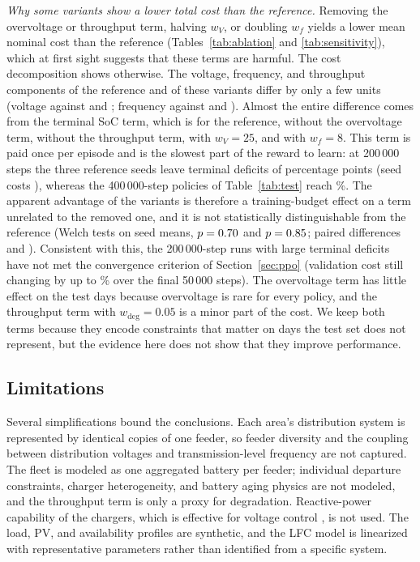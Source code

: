 \emph{Why some variants show a lower total cost than the reference.}
Removing the overvoltage or throughput term, halving $w_V$, or
doubling $w_f$ yields a lower mean nominal cost than the reference
(Tables~\ref{tab:ablation} and \ref{tab:sensitivity}),
which at first sight suggests that these terms are harmful. The cost
decomposition shows otherwise. The voltage, frequency, and throughput
components of the reference and of these variants differ by only a few
units (voltage \AblRefCostV{} against \AblNoOVCostV{} and
\AblNoDegCostV; frequency \AblRefCostF{} against \AblNoOVCostF{} and
\AblNoDegCostF). Almost the entire difference comes from the terminal
SoC term, which is \AblRefCostTerm{} for the reference,
\AblNoOVCostTerm{} without the overvoltage term, \AblNoDegCostTerm{}
without the throughput term, \AblWvLowCostTerm{} with $w_V=25$, and
\AblWfHighCostTerm{} with $w_f=8$. This
term is paid once per episode and is the slowest part of the reward to
learn: at 200\,000 steps the three reference seeds leave terminal
deficits of \AblRefSeedSocDefs{} percentage points (seed costs
\AblRefSeedCosts), whereas the 400\,000-step policies of
Table~\ref{tab:test} reach \TPPOSocDefPct\%. The apparent advantage of the variants is therefore a
training-budget effect on a term unrelated to the removed one, and it is
not statistically distinguishable from the reference (Welch tests on
seed means, $p=0.70$ and $p=0.85$; paired differences
\AblNoOVPairDiffs{} and \AblNoDegPairDiffs). Consistent with this, the
200\,000-step runs with large terminal deficits have not met the
convergence criterion of Section~\ref{sec:ppo} (validation cost still
changing by up to \AblNoOVConvMax\% over the final 50\,000 steps). The
overvoltage term has little effect on the test days because
overvoltage is rare for every policy, and the throughput term with
$w_{\mathrm{deg}}=0.05$ is a minor part of the cost. We keep both terms
because they encode constraints that matter on days the test set does
not represent, but the evidence here does not show that they improve
performance.




\subsection{Limitations}
\label{sec:limits}

Several simplifications bound the conclusions. Each area's
distribution system is represented by identical copies of one feeder,
so feeder diversity and the coupling between distribution voltages and
transmission-level frequency are not captured. The fleet is modeled as
one aggregated battery per feeder; individual departure constraints,
charger heterogeneity, and battery aging physics are not modeled, and
the throughput term is only a proxy for degradation. Reactive-power
capability of the chargers, which is effective for voltage control
\cite{HuEtAl2022}, is not used. The load, PV, and availability profiles
are synthetic, and the LFC model is linearized with representative
parameters rather than identified from a specific system.

